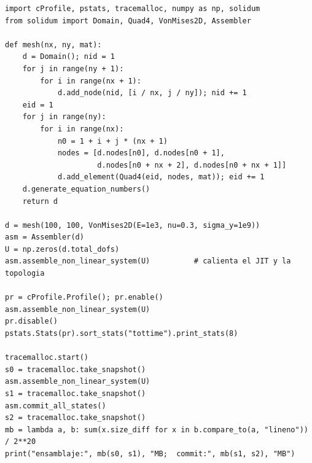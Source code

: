 \documentclass[11pt,letterpaper,oneside]{article}
\begin{document}
\begin{lstlisting}
import cProfile, pstats, tracemalloc, numpy as np, solidum
from solidum import Domain, Quad4, VonMises2D, Assembler

def mesh(nx, ny, mat):
    d = Domain(); nid = 1
    for j in range(ny + 1):
        for i in range(nx + 1):
            d.add_node(nid, [i / nx, j / ny]); nid += 1
    eid = 1
    for j in range(ny):
        for i in range(nx):
            n0 = 1 + i + j * (nx + 1)
            nodes = [d.nodes[n0], d.nodes[n0 + 1],
                     d.nodes[n0 + nx + 2], d.nodes[n0 + nx + 1]]
            d.add_element(Quad4(eid, nodes, mat)); eid += 1
    d.generate_equation_numbers()
    return d

d = mesh(100, 100, VonMises2D(E=1e3, nu=0.3, sigma_y=1e9))
asm = Assembler(d)
U = np.zeros(d.total_dofs)
asm.assemble_non_linear_system(U)          # calienta el JIT y la topologia

pr = cProfile.Profile(); pr.enable()
asm.assemble_non_linear_system(U)
pr.disable()
pstats.Stats(pr).sort_stats("tottime").print_stats(8)

tracemalloc.start()
s0 = tracemalloc.take_snapshot()
asm.assemble_non_linear_system(U)
s1 = tracemalloc.take_snapshot()
asm.commit_all_states()
s2 = tracemalloc.take_snapshot()
mb = lambda a, b: sum(x.size_diff for x in b.compare_to(a, "lineno")) / 2**20
print("ensamblaje:", mb(s0, s1), "MB;  commit:", mb(s1, s2), "MB")
\end{lstlisting}
\end{document}
